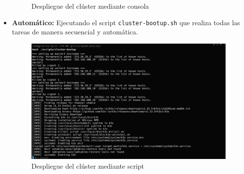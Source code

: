 \begin{itemize}
\begin{figure}[H]
        \caption{Despliegue del clúster mediante consola}\label{fig:consola}
    \end{figure}
    \item \textbf{Automático:} Ejecutando el script \texttt{cluster-bootup.sh} que realiza todas las tareas de manera secuencial y automática.
    \begin{figure}[H]
        \centering
        \includegraphics[scale=0.15]{./tablas-images/cp6/cluster-deploy/deploy-script.png}
        \caption{Despliegue del clúster mediante script}\label{fig:script}
    \end{figure}
\end{itemize}